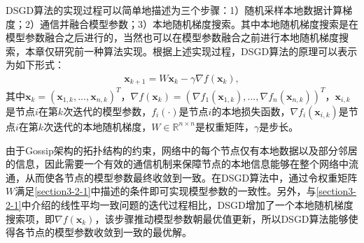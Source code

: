 DSGD算法的实现过程可以简单地描述为三个步骤：1）随机采样本地数据计算梯度；2）通信并融合模型参数；3）本地随机梯度搜索。其中本地随机梯度搜索是在模型参数融合之后进行的，当然也可以在模型参数融合之前进行本地随机梯度搜索，本章仅研究前一种算法实现。根据上述实现过程，DSGD算法的原理可以表示为如下形式：
\begin{equation}
    \label{tab:DSGD-equation}
    \begin{aligned}
        \boldsymbol{x}_{k+1} =W\boldsymbol{x}_k -\gamma \nabla f\left( \boldsymbol{x}_k \right),
    \end{aligned}
\end{equation}
其中$\boldsymbol{x}_k =\left( \boldsymbol{x}_{1,k} ,...,\boldsymbol{x}_{n,k} \right) ^T$，$\nabla f\left( \boldsymbol{x}_k \right) =\left( \nabla f_1\left( \boldsymbol{x}_{1,k} \right) ,...,\nabla f_n\left( \boldsymbol{x}_{n,k} \right) \right) ^T$，$\boldsymbol{x}_{i,k} $是节点$i$在第$k$次迭代的模型参数，$f_i\left( \cdot \right) $是节点$i$的本地损失函数，$\nabla f_i\left( \boldsymbol{x}_{i,k} \right) $是节点$i$在第$k$次迭代的本地随机梯度，$W\in \mathbb{R} ^{n\times n}$是权重矩阵，$\gamma$是步长。

由于Gossip架构的拓扑结构的约束，网络中的每个节点仅有本地数据以及部分邻居的信息，因此需要一个有效的通信机制来保障节点的本地信息能够在整个网络中流通，从而使各节点的模型参数最终收敛到一致。在DSGD算法中，通过令权重矩阵$W$满足\autoref{section3-2-1}中描述的条件即可实现模型参数的一致性。另外，与\autoref{section3-2-1}中介绍的线性平均一致问题的迭代过程相比，DSGD增加了一个本地随机梯度搜索项，即$\nabla f\left( \boldsymbol{x}_k \right)$，该步骤推动模型参数朝最优值更新，所以DSGD算法能够使得各节点的模型参数收敛到一致的最优解。

